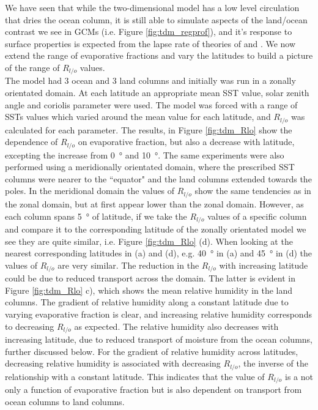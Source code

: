 We have seen that while the two-dimensional model has a low level circulation 
that dries the ocean column, it is still able to simulate aspects of the 
land/ocean contrast we see in GCMs (i.e. Figure \ref{fig:tdm_regprof}), and it's 
response to surface properties is expected from the lapse rate of theories of 
\cite{Joshi2007} and \cite{Byrne2013a}. We now extend the range of evaporative 
fractions and vary the latitudes to build a picture of the range of $R_{l/o}$ 
values.\\
The model had 3 ocean and 3 land columns and initially was run in a zonally 
orientated domain. At each latitude an appropriate mean SST value, solar zenith 
angle and coriolis parameter were used.  The model was forced with a range of 
SSTs values which varied around the mean value for each latitude, and $R_{l/o}$ 
was calculated for each parameter.	The results, in Figure \ref{fig:tdm_Rlo} 
show the dependence of $R_{l/o}$ on evaporative fraction, but also a decrease 
with latitude, excepting the increase from \SI{0}{\degree} and \SI{10}{\degree}.  
The same experiments were also performed using a meridionally orientated domain, 
where the prescribed SST columns were nearer to the ``equator" and the land 
columns extended towards the poles.  In the meridional domain the values of 
$R_{l/o}$ show the same tendencies as in the zonal domain, but at first appear 
lower than the zonal domain. However, as each column spans \SI{5}{\degree} of 
latitude, if we take the $R_{l/o}$ values of a specific column and compare it to 
the corresponding latitude of the zonally orientated model we see they are quite 
similar, i.e. Figure \ref{fig:tdm_Rlo} (d). When looking at the nearest 
corresponding latitudes in (a) and (d), e.g. \SI{40}{\degree} in (a) and 
\SI{45}{\degree} in (d) the values of $R_{l/o}$ are very similar.  The reduction 
in the $R_{l/o}$ with increasing latitude could be due to reduced transport 
across the domain. The latter is evident in Figure \ref{fig:tdm_Rlo} c), which 
shows the mean relative humidity in the land columns. The gradient of relative 
humidity along a constant latitude due to varying evaporative fraction is clear, 
and increasing relative humidity corresponds to decreasing $R_{l/o}$ as 
expected.  The relative humidity also decreases with increasing latitude, due to 
reduced transport of moisture from the ocean columns, further discussed below.  
For the gradient of relative humidity across latitudes, decreasing relative 
humidity is associated with decreasing $R_{l/o}$, the inverse of the 
relationship with a constant latitude.  This indicates that the value of 
$R_{l/o}$ is a not only a function of evaporative fraction but is also dependent 
on transport from ocean columns to land columns.\\

